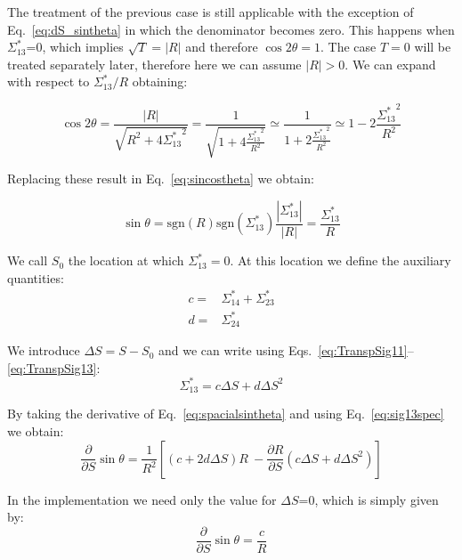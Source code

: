 The treatment of the previous case is still applicable with the exception of Eq.~\ref{eq:dS_sintheta} in which the denominator becomes zero.
This happens when $\Sigma^*_{13}$=0, which implies $\sqrt{T}=\left| R \right|$ and therefore $\cos 2 \theta = 1$. The case $T=0$ will be treated separately later, therefore here we can assume $\left| R \right|>0$. We can expand with respect to ${\Sigma^*_{13}}/{R}$ obtaining:

\begin{equation}
\cos 2 \theta = \frac{\left| R \right|}{\sqrt{R^2+4 {\Sigma^*_{13}}^2}} = \frac{1}{\sqrt{1+4 \frac{{\Sigma^*_{13}}^2}{R^2}}} \simeq \frac{1}{1+2 \frac{{\Sigma^*_{13}}^2}{R^2}} \simeq 1-2 \frac{{\Sigma^*_{13}}^2}{R^2}
\end{equation}

Replacing these result in Eq.~\ref{eq:sincostheta} we obtain:

\begin{equation}
\sin \theta = \mathrm{sgn}(R)\mathrm{sgn}(\Sigma^*_{13})\frac{\left| \Sigma^*_{13} \right|}{\left| R \right|} = \frac{\Sigma^*_{13} }{ R } \label{eq:spacialsintheta}
\end{equation}





We call $S_0$ the location at which ${\Sigma}^*_{13}=0$. At this location we define the auxiliary quantities:
\begin{align}
c =& \Sigma^*_{14} + \Sigma^*_{23}\\
d =& \Sigma^*_{24}
\end{align}

We introduce $\Delta S = S - S_0$ and we can write using Eqs.~\ref{eq:TranspSig11}--\ref{eq:TranspSig13}:
\begin{equation}
\Sigma^*_{13} = c \Delta S +d \Delta S^2 \label{eq:sig13spec}
\end{equation}

By taking the derivative of Eq.~\ref{eq:spacialsintheta} and using Eq.~\ref{eq:sig13spec} we obtain:
\begin{equation}
\frac{\partial }{\partial S} \sin \theta =\frac{1}{R^2}\left[\left(c + 2d \Delta S \right) R \ - \frac{\partial R }{\partial S}\left(c\Delta S + d \Delta S^2 \right)\right]
\end{equation}

In the implementation we need only the value for $\Delta S$=0, which is simply given by:
\begin{equation}
\frac{\partial }{\partial S} \sin \theta =\frac{c}{R}
\end{equation}
 
